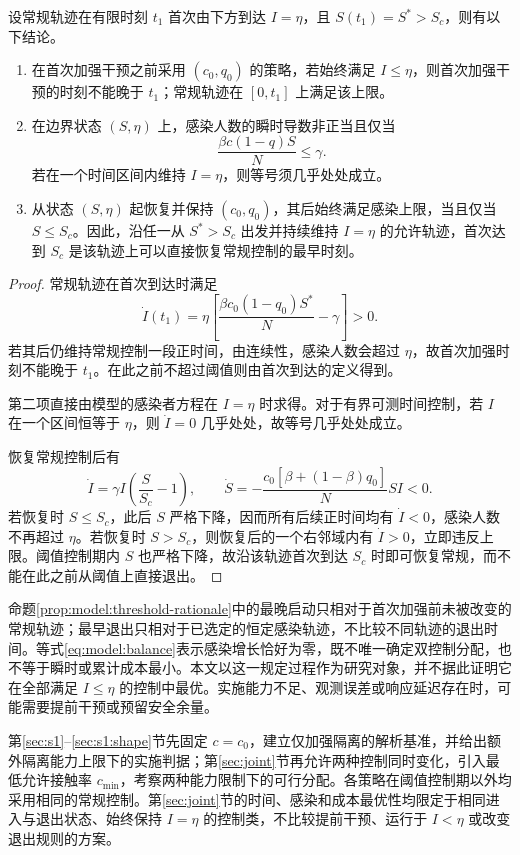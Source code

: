 \documentclass[lang=cn,a4paper,newtx]{elegantpaper}
\numberwithin{equation}{section}
\theoremstyle{plain}
\begin{document}
\begin{proposition}
\label{prop:model:threshold-rationale}
设常规轨迹在有限时刻 $t_1$ 首次由下方到达 $I=\eta$，且 $S(t_1)=S^*>S_c$，则有以下结论。
\begin{enumerate}
\renewcommand{\labelenumi}{(\roman{enumi})}
\item 在首次加强干预之前采用 $(c_0,q_0)$ 的策略，若始终满足 $I\le\eta$，则首次加强干预的时刻不能晚于 $t_1$；常规轨迹在 $[0,t_1]$ 上满足该上限。
\item 在边界状态 $(S,\eta)$ 上，感染人数的瞬时导数非正当且仅当
\[
\frac{\beta c(1-q)S}{N}\le\gamma.
\]
若在一个时间区间内维持 $I=\eta$，则等号须几乎处处成立。
\item 从状态 $(S,\eta)$ 起恢复并保持 $(c_0,q_0)$，其后始终满足感染上限，当且仅当 $S\le S_c$。因此，沿任一从 $S^*>S_c$ 出发并持续维持 $I=\eta$ 的允许轨迹，首次达到 $S_c$ 是该轨迹上可以直接恢复常规控制的最早时刻。
\end{enumerate}
\end{proposition}
\begin{proof}
常规轨迹在首次到达时满足
\[
\dot I(t_1)=\eta\left[\frac{\beta c_0(1-q_0)S^*}{N}-\gamma\right]>0.
\]
若其后仍维持常规控制一段正时间，由连续性，感染人数会超过 $\eta$，故首次加强时刻不能晚于 $t_1$。在此之前不超过阈值则由首次到达的定义得到。

第二项直接由模型的感染者方程在 $I=\eta$ 时求得。对于有界可测时间控制，若 $I$ 在一个区间恒等于 $\eta$，则 $\dot I=0$ 几乎处处，故等号几乎处处成立。

恢复常规控制后有
\[
\dot I=\gamma I\left(\frac{S}{S_c}-1\right),\qquad
\dot S=-\frac{c_0[\beta+(1-\beta)q_0]}{N}SI<0.
\]
若恢复时 $S\le S_c$，此后 $S$ 严格下降，因而所有后续正时间均有 $\dot I<0$，感染人数不再超过 $\eta$。若恢复时 $S>S_c$，则恢复后的一个右邻域内有 $\dot I>0$，立即违反上限。阈值控制期内 $S$ 也严格下降，故沿该轨迹首次到达 $S_c$ 时即可恢复常规，而不能在此之前从阈值上直接退出。
\end{proof}

命题\ref{prop:model:threshold-rationale}中的最晚启动只相对于首次加强前未被改变的常规轨迹；最早退出只相对于已选定的恒定感染轨迹，不比较不同轨迹的退出时间。等式\eqref{eq:model:balance}表示感染增长恰好为零，既不唯一确定双控制分配，也不等于瞬时或累计成本最小。本文以这一规定过程作为研究对象，并不据此证明它在全部满足 $I\le\eta$ 的控制中最优。实施能力不足、观测误差或响应延迟存在时，可能需要提前干预或预留安全余量。

第\ref{sec:s1}--\ref{sec:s1:shape}节先固定 $c=c_0$，建立仅加强隔离的解析基准，并给出额外隔离能力上限下的实施判据；第\ref{sec:joint}节再允许两种控制同时变化，引入最低允许接触率 $c_{\min}$，考察两种能力限制下的可行分配。各策略在阈值控制期以外均采用相同的常规控制。第\ref{sec:joint}节的时间、感染和成本最优性均限定于相同进入与退出状态、始终保持 $I=\eta$ 的控制类，不比较提前干预、运行于 $I<\eta$ 或改变退出规则的方案。
\end{document}
